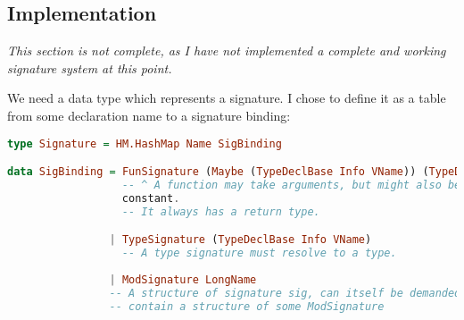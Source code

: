 \subsection{Implementation}
\textit{This section is not complete, as I have not implemented a complete and working
signature system at this point.
}

We need a data type which represents a signature.
I chose to define it as a table from some declaration name to a signature
binding:
\begin{lstlisting}[language=Haskell]
type Signature = HM.HashMap Name SigBinding

data SigBinding = FunSignature (Maybe (TypeDeclBase Info VName)) (TypeDeclBase Info VName)
                  -- ^ A function may take arguments, but might also be a
                  constant.
                  -- It always has a return type.

                | TypeSignature (TypeDeclBase Info VName)
                  -- A type signature must resolve to a type.  
                  
                | ModSignature LongName
                -- A structure of signature sig, can itself be demanded to
                -- contain a structure of some ModSignature
\end{lstlisting}